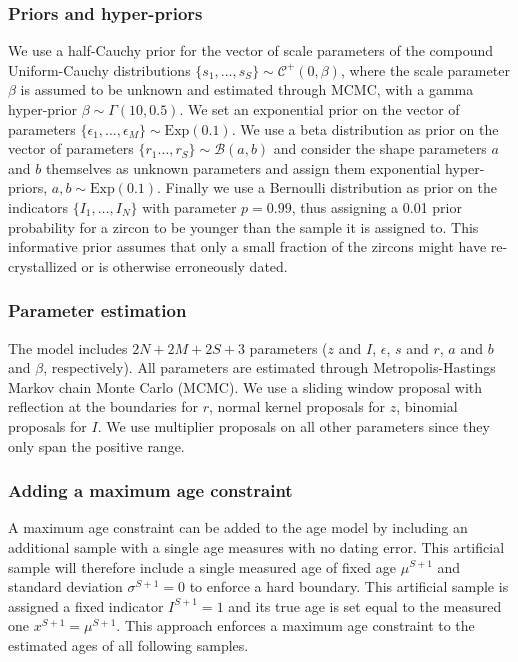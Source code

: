 \documentclass[12pt,letterpaper]{article}
\begin{document}
\subsubsection{Priors and hyper-priors}
We use a half-Cauchy prior for the vector of scale parameters of the compound Uniform-Cauchy distributions $\{s_1, \dots, s_S \} \sim \mathcal{C}^+(0, \beta)$, where the scale parameter $\beta$ is assumed to be unknown and estimated through MCMC, with a gamma hyper-prior $\beta \sim \Gamma(10, 0.5)$. 
We set an exponential prior on the vector of parameters $\{\epsilon_1, \dots, \epsilon_M \} \sim \text{Exp}(0.1)$.
We use a beta distribution as prior on the vector of parameters $\{r_1 \dots, r_S\} \sim \mathcal{B}(a, b)$ and consider the shape parameters $a$ and $b$ themselves as unknown parameters and assign them exponential hyper-priors, $a, b \sim \text{Exp}(0.1)$.
Finally we use a Bernoulli distribution as prior on the indicators $\{I_1, \dots, I_N\}$ with parameter $p = 0.99$, thus assigning a 0.01 prior probability for a zircon to be younger than the sample it is assigned to. This informative prior assumes that only a small fraction of the zircons might have re-crystallized or is otherwise erroneously dated. 

\subsubsection{Parameter estimation}
The model includes $2N + 2M + 2S + 3$ parameters ($z$ and $I$, $\epsilon$, $s$ and $r$, $a$ and $b$ and $\beta$, respectively). 
All parameters are estimated through Metropolis-Hastings Markov chain Monte Carlo (MCMC). We use a sliding window proposal with reflection at the boundaries for $r$, normal kernel proposals for $z$, binomial proposals for $I$. We use multiplier proposals on all other parameters since they only span the positive range. 


\subsubsection{Adding a maximum age constraint}
A maximum age constraint can be added to the age model by including an additional sample with a single age measures with no dating error. This artificial sample will therefore include a single measured age of fixed age $\mu^{S+1}$ and standard deviation $\sigma^{S+1} = 0$ to enforce a hard boundary. 
This artificial sample is assigned a fixed indicator $I^{S+1} = 1$ and its true age is set equal to the measured one $x^{S+1} = \mu^{S+1}$. 
This approach enforces a maximum age constraint to the estimated ages of all following samples. 
\end{document}
